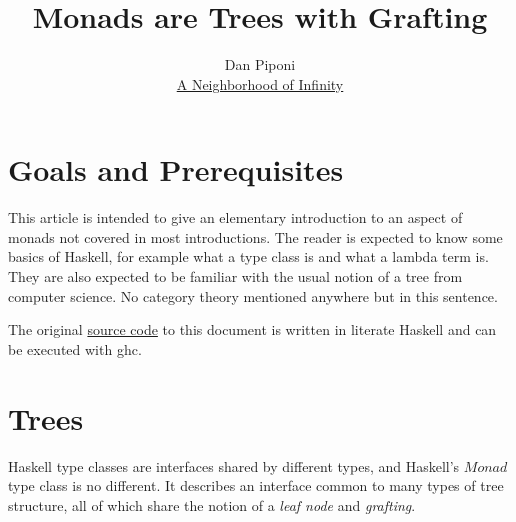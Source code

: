 \documentclass{article}
\newcommand{\Conid}[1]{\mathit{#1}}
\begin{document}
 

\title{Monads are Trees with Grafting}
\author{Dan Piponi\\\href{http://blog.sigfpe.com}{A Neighborhood of Infinity}}
\maketitle

\section{Goals and Prerequisites}
This article is intended to give an elementary introduction to an aspect of monads not covered in most introductions. The reader is expected to know some basics of Haskell, for example what a type class is and what a lambda term is. They are also expected to be familiar with the usual notion of a tree from computer science. No category theory mentioned anywhere but in this sentence.

The original \href{https://dl.dropbox.com/u/828035/Monads/monads.lhs}{source code} to this document is written in literate Haskell and can be executed with ghc.

\section{Trees}
Haskell type classes are interfaces shared by different types, and Haskell's \ensuremath{\Conid{Monad}} type class is no different. It describes an interface common to many types of tree structure, all of which share the notion of a {\em leaf node} and {\em grafting}.
\end{document}
